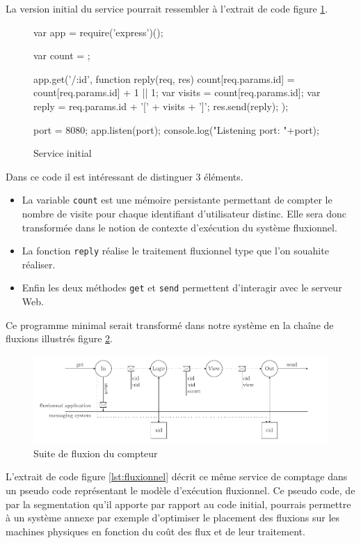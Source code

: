 La version initial du service pourrait ressembler à l'extrait de code figure \ref{lst:classique}.

\begin{figure}
  \begin{code}
  var app = require('express')();

  var count = {};

  app.get('/:id', function reply(req, res){
    count[req.params.id] = count[req.params.id] + 1  || 1;
    var visits = count[req.params.id];
    var reply = req.params.id + '[' + visits + ']';
    res.send(reply);
  });

  port = 8080;
  app.listen(port);
  console.log("Listening port: "+port);
  \end{code}
  \caption{Service initial}
  \label{lst:classique}
\end{figure}

Dans ce code il est intéressant de distinguer 3 éléments.
\begin{itemize}
  \item La variable \texttt{count} est une mémoire persistante permettant de compter le nombre de visite pour chaque identifiant d'utilisateur distinc.
  Elle sera donc transformée dans le notion de contexte d'exécution du système fluxionnel.
  \item La fonction \texttt{reply} réalise le traitement fluxionnel type que l'on souahite réaliser.
  \item Enfin les deux méthodes \texttt{get} et \texttt{send} permettent d'interagir avec le serveur Web.
\end{itemize}

Ce programme minimal serait transformé dans notre système en la chaîne de fluxions illustrés figure \ref{fig:fluxions}.

\begin{figure}[h!]
  \includegraphics[width=\linewidth]{flux.pdf}
  \caption{Suite de fluxion du compteur}
  \label{fig:fluxions}
\end{figure}

L'extrait de code figure \ref{lst:fluxionnel} décrit ce même service de comptage dans un pseudo code représentant le modèle d'exécution fluxionnel.
Ce pseudo code, de par la segmentation qu'il apporte par rapport au code initial, pourrais permettre à un système annexe par exemple d'optimiser le placement des fluxions sur les machines physiques en fonction du coût des flux et de leur traitement.

